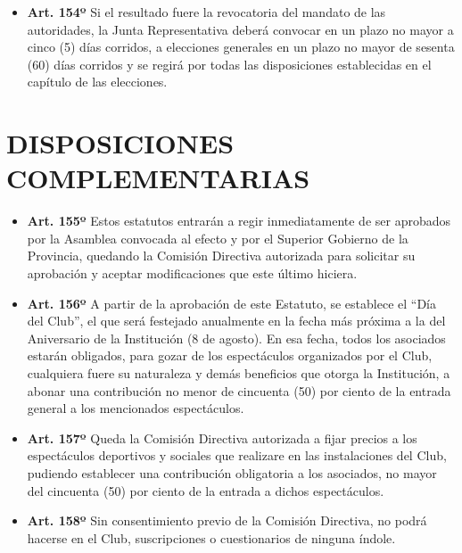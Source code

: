 \documentclass[openany]{book}
\providecommand{\tightlist}{%
  \setlength{\itemsep}{0pt}\setlength{\parskip}{0pt}}
\begin{document}
\begin{itemize}
\tightlist
\item
  \textbf{Art. 154º}
  Si el resultado fuere la revocatoria del mandato de las autoridades, la Junta Representativa deberá convocar en un plazo no mayor a cinco (5) días corridos, a elecciones generales en un plazo no mayor de sesenta (60) días corridos y se regirá por todas las disposiciones establecidas en el capítulo de las elecciones.
\end{itemize}

\hypertarget{cap26}{%
\chapter{DISPOSICIONES COMPLEMENTARIAS}\label{cap26}}

\begin{itemize}
\tightlist
\item
  \textbf{Art. 155º}
  Estos estatutos entrarán a regir inmediatamente de ser aprobados por la Asamblea convocada al efecto y por el Superior Gobierno de la Provincia, quedando la Comisión Directiva autorizada para solicitar su aprobación y aceptar modificaciones que este último hiciera.
\end{itemize}

\begin{itemize}
\tightlist
\item
  \textbf{Art. 156º}
  A partir de la aprobación de este Estatuto, se establece el ``Día del Club'', el que será festejado anualmente en la fecha más próxima a la del Aniversario de la Institución (8 de agosto). En esa fecha, todos los asociados estarán obligados, para gozar de los espectáculos organizados por el Club, cualquiera fuere su naturaleza y demás beneficios que otorga la Institución, a abonar una contribución no menor de cincuenta (50) por ciento de la entrada general a los mencionados espectáculos.
\end{itemize}

\begin{itemize}
\tightlist
\item
  \textbf{Art. 157º}
  Queda la Comisión Directiva autorizada a fijar precios a los espectáculos deportivos y sociales que realizare en las instalaciones del Club, pudiendo establecer una contribución obligatoria a los asociados, no mayor del cincuenta (50) por ciento de la entrada a dichos espectáculos.
\end{itemize}

\begin{itemize}
\tightlist
\item
  \textbf{Art. 158º}
  Sin consentimiento previo de la Comisión Directiva, no podrá hacerse en el Club, suscripciones o cuestionarios de ninguna índole.
\end{itemize}
\end{document}
